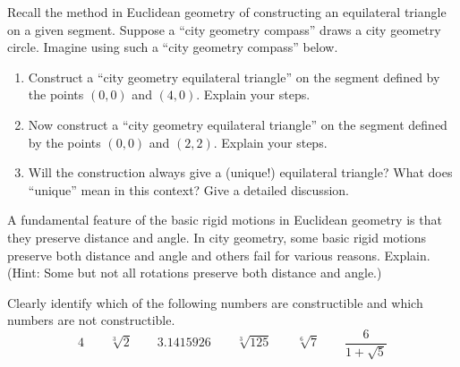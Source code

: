 \begin{prob} 
Recall the method in Euclidean geometry of constructing an equilateral triangle on a given segment.  Suppose a ``city geometry compass'' draws a city geometry circle.  Imagine using such a ``city geometry compass'' below.  
\begin{enumerate}
\item Construct a ``city geometry equilateral triangle'' on the segment defined by the
  points $(0,0)$ and $(4,0)$. Explain your steps.
\item Now construct a ``city geometry equilateral triangle'' on the segment defined by the
  points $(0,0)$ and $(2,2)$. Explain your steps.
\item Will the construction always give a (unique!) equilateral triangle? What does ``unique'' mean in this context? Give a detailed discussion.  
\end{enumerate}
\end{prob} 



%
%  
%

\begin{prob}
A fundamental feature of the basic rigid motions in Euclidean geometry is that they preserve distance and angle.  In city geometry, some basic rigid motions preserve both distance and angle and others fail for various reasons.  Explain.  (Hint:  Some but not all rotations preserve both distance and angle.)  
\end{prob}

\newpage

\begin{prob} 
Clearly identify which of the following numbers are constructible and
which numbers are not constructible.
\[
4 \qquad  \sqrt[3]{2} \qquad3.1415926 \qquad \sqrt[3]{125} \qquad \sqrt[6]{7} \qquad \frac{6}{1+\sqrt{5}}
\]
\end{prob}

